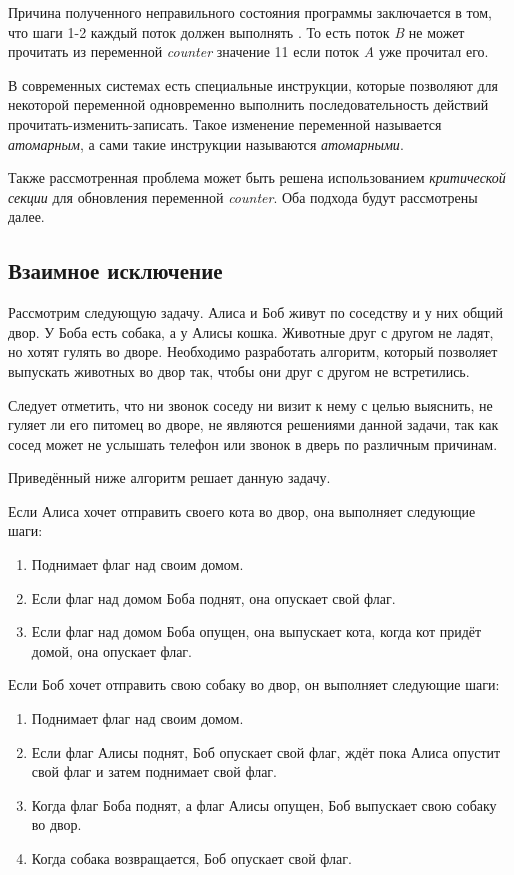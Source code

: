 Причина полученного неправильного состояния программы заключается в том, что
шаги 1-2 каждый поток должен выполнять . То есть поток
\textit{B} не может прочитать из переменной \textit{counter} значение 11 если
поток \textit{A} уже прочитал его.

В современных системах есть специальные инструкции, которые позволяют для
некоторой переменной одновременно выполнить последовательность действий
прочитать-изменить-записать. Такое изменение переменной называется
\textit{атомарным}, а сами такие инструкции называются \textit{атомарными}.

Также рассмотренная проблема может быть решена использованием
\textit{критической секции} для обновления переменной \textit{counter}. Оба
подхода будут рассмотрены далее.

\subsection{Взаимное исключение}
\label{1-2}

Рассмотрим следующую задачу. Алиса и Боб живут по соседству и у них общий двор.
У Боба есть собака, а у Алисы кошка. Животные друг с другом не ладят, но хотят
гулять во дворе. Необходимо разработать алгоритм, который позволяет выпускать
животных во двор так, чтобы они друг с другом не встретились.

Следует отметить, что ни звонок соседу ни визит к нему с целью выяснить, не
гуляет ли его питомец во дворе, не являются решениями данной задачи, так как
сосед может не услышать телефон или звонок в дверь по различным причинам.

Приведённый ниже алгоритм решает данную задачу.

Если Алиса хочет отправить своего кота во двор, она выполняет следующие шаги:

\begin{enumerate}
    \item Поднимает флаг над своим домом.
    \item Если флаг над домом Боба поднят, она опускает свой флаг.
    \item Если флаг над домом Боба опущен, она выпускает кота, когда кот придёт
    домой, она опускает флаг.
\end{enumerate}

Если Боб хочет отправить свою собаку во двор, он выполняет следующие шаги:

\begin{enumerate}
    \item Поднимает флаг над своим домом.
    \item Если флаг Алисы поднят, Боб опускает свой флаг, ждёт пока Алиса
    опустит свой флаг и затем поднимает свой флаг.
    \item Когда флаг Боба поднят, а флаг Алисы опущен, Боб выпускает свою собаку
    во двор.
    \item Когда собака возвращается, Боб опускает свой флаг.
\end{enumerate}

